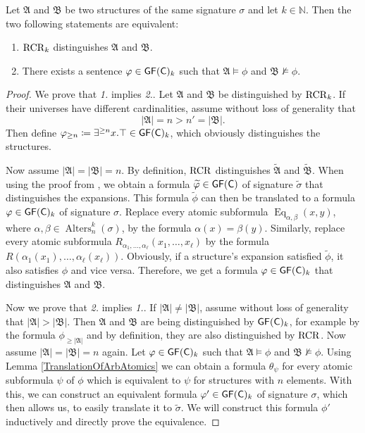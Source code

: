 \begin{theorem}
	\label{thm:ThmB}
	Let $\mathfrak A$ and $\mathfrak B$ be two structures of the same signature $\sigma$ and let $k\in \mathbb{N}$.
	Then the two following statements are equivalent:
	\begin{enumerate}
		\item $\operatorname{RCR}_k$ distinguishes $\mathfrak A$ and $\mathfrak B$.
		\item There exists a sentence $\varphi\in\mathsf{GF}(\mathsf{C})_k$ such that $\mathfrak A\models \phi$ and $\mathfrak B\not\models \phi$.
	\end{enumerate}
\end{theorem}
\begin{proof}
	We prove that \emph{1.} implies \emph{2.}. 
	Let $\mathfrak A$ and $\mathfrak B$ be distinguished by $\operatorname{RCR}_k$.
	If their universes have different cardinalities, assume without loss of generality that 
	$$\vert \mathfrak A \vert =n > n'=\vert \mathfrak B \vert.$$
	Then define $\varphi_{\geq n}\coloneqq \exists^{\geq n} x. \top\in \mathsf{GF}(\mathsf{C})_k$, which obviously distinguishes the structures.
	
	Now assume $\vert \mathfrak A\vert = \vert \mathfrak B \vert = n$.
	By definition, $\operatorname{RCR}$ distinguishes $\widetilde{\mathfrak A}$ and $\widetilde{\mathfrak B}$.
	When using the proof from \cite{scheidt2025ColorRefinement}, we obtain a formula $\widetilde{\varphi}\in \mathsf{GF}(\mathsf{C})$ of signature $\widetilde{\sigma}$ that distinguishes the expansions.
	This formula $\widetilde{\phi}$ can then be translated to a formula $\varphi\in\mathsf{GF}(\mathsf{C})_k$ of signature $\sigma$.
	Replace every atomic subformula $\operatorname{Eq}_{\alpha,\beta}(x,y)$, where $\alpha,\beta\in \operatorname{Alters}_n^k(\sigma)$,  by the formula $\alpha(x)=\beta(y)$.
	Similarly, replace every atomic subformula $R_{\alpha_1,\dots,\alpha_\ell}(x_1,\dots,x_\ell)$ by the formula $R(\alpha_1(x_1),\dots,\alpha_\ell(x_\ell))$.
	Obviously, if a structure's expansion satisfied $\widetilde{\phi}$, it also satisfies $\phi$ and vice versa.
	Therefore, we get a formula $\varphi\in \mathsf{GF}(\mathsf{C})_k$ that distinguishes $\mathfrak A$ and $\mathfrak B$.
	
	Now we prove that \emph{2.} implies \emph{1.}.
	If $\vert \mathfrak A \vert \neq \vert \mathfrak B \vert$, assume without loss of generality that $\vert \mathfrak A \vert > \vert \mathfrak B \vert$.
	Then $\mathfrak A$ and $\mathfrak B$ are being distinguished by $\mathsf{GF}(\mathsf{C})_k$, for example by the formula $\phi_{\geq\vert\mathfrak A\vert}$ and by definition, they are also distinguished by $\operatorname{RCR}$.
	Now assume $\vert \mathfrak A\vert = \vert \mathfrak B \vert =n$ again.
	Let $\varphi\in \mathsf{GF}(\mathsf{C})_k$ such that $\mathfrak A\models \phi$ and $\mathfrak B\not\models \phi$.
	Using Lemma \ref{TranslationOfArbAtomics} we can obtain a formula $\theta_\psi$ for every atomic subformula $\psi$ of $\phi$ which is equivalent to $\psi$ for structures with $n$ elements.
	With this, we can construct an equivalent formula $\varphi'\in\mathsf{GF}(\mathsf{C})_k$ of signature $\sigma$, which then allows us, to easily translate it to $\widetilde{\sigma}$.
	We will construct this formula $\phi'$ inductively and directly prove the equivalence.
	

\end{proof}
